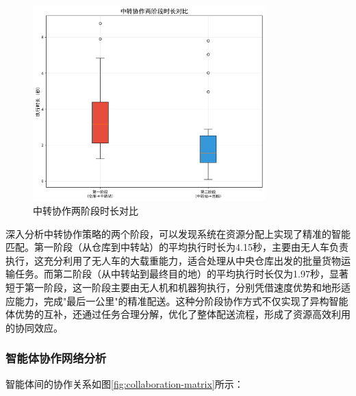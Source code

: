 \documentclass[12pt,a4paper]{article}
\begin{document}
\begin{figure}[h]
    \centering
    \includegraphics[width=0.8\textwidth]{analysis_results/relay_stages_comparison_20250617_081456.png}
    \caption{中转协作两阶段时长对比}
    \label{fig:relay-stages-comparison}
\end{figure}

深入分析中转协作策略的两个阶段，可以发现系统在资源分配上实现了精准的智能匹配。第一阶段（从仓库到中转站）的平均执行时长为4.15秒，主要由无人车负责执行，这充分利用了无人车的大载重能力，适合处理从中央仓库出发的批量货物运输任务。而第二阶段（从中转站到最终目的地）的平均执行时长仅为1.97秒，显著短于第一阶段，这一阶段主要由无人机和机器狗执行，分别凭借速度优势和地形适应能力，完成"最后一公里"的精准配送。这种分阶段协作方式不仅实现了异构智能体优势的互补，还通过任务合理分解，优化了整体配送流程，形成了资源高效利用的协同效应。

\subsubsection{智能体协作网络分析}

智能体间的协作关系如图\ref{fig:collaboration-matrix}所示：
\end{document}
